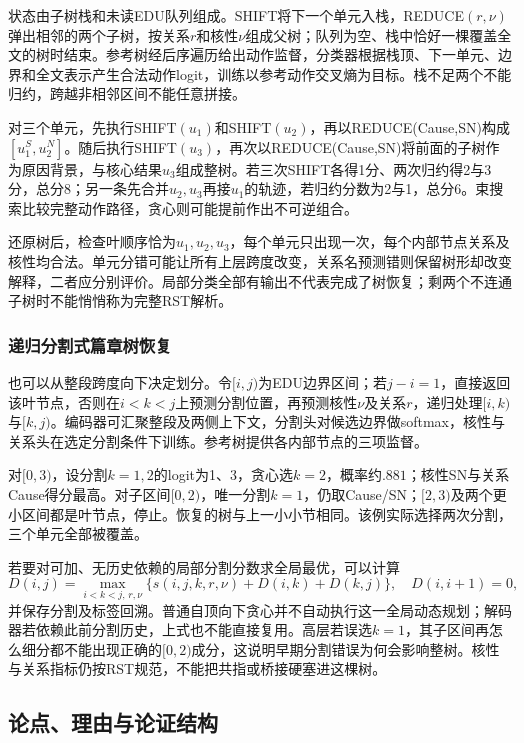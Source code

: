 状态由子树栈和未读EDU队列组成。SHIFT将下一个单元入栈，REDUCE$(r,\nu)$弹出相邻的两个子树，按关系$r$和核性$\nu$组成父树；队列为空、栈中恰好一棵覆盖全文的树时结束。参考树经后序遍历给出动作监督，分类器根据栈顶、下一单元、边界和全文表示产生合法动作logit，训练以参考动作交叉熵为目标。栈不足两个不能归约，跨越非相邻区间不能任意拼接。

对三个单元，先执行SHIFT$(u_1)$和SHIFT$(u_2)$，再以REDUCE(Cause,SN)构成$[u_1^{S},u_2^{N}]$。随后执行SHIFT$(u_3)$，再次以REDUCE(Cause,SN)将前面的子树作为原因背景，与核心结果$u_3$组成整树。若三次SHIFT各得1分、两次归约得2与3分，总分8；另一条先合并$u_2,u_3$再接$u_1$的轨迹，若归约分数为2与1，总分6。束搜索比较完整动作路径，贪心则可能提前作出不可逆组合。

还原树后，检查叶顺序恰为$u_1,u_2,u_3$，每个单元只出现一次，每个内部节点关系及核性均合法。单元分错可能让所有上层跨度改变，关系名预测错则保留树形却改变解释，二者应分别评价。局部分类全部有输出不代表完成了树恢复；剩两个不连通子树时不能悄悄称为完整RST解析。

\subsubsection{递归分割式篇章树恢复}
\label{sec:nlp-analysis-rst-split}

也可以从整段跨度向下决定划分。令$[i,j)$为EDU边界区间；若$j-i=1$，直接返回该叶节点，否则在$i<k<j$上预测分割位置，再预测核性$\nu$及关系$r$，递归处理$[i,k)$与$[k,j)$。编码器可汇聚整段及两侧上下文，分割头对候选边界做softmax，核性与关系头在选定分割条件下训练。参考树提供各内部节点的三项监督。

对$[0,3)$，设分割$k=1,2$的logit为1、3，贪心选$k=2$，概率约$.881$；核性SN与关系Cause得分最高。对子区间$[0,2)$，唯一分割$k=1$，仍取Cause/SN；$[2,3)$及两个更小区间都是叶节点，停止。恢复的树与上一小小节相同。该例实际选择两次分割，三个单元全部被覆盖。

若要对可加、无历史依赖的局部分割分数求全局最优，可以计算
\[
 D(i,j)=\max_{i<k<j,\,r,\nu}
       \{s(i,j,k,r,\nu)+D(i,k)+D(k,j)\},
 \quad D(i,i+1)=0,
\]
并保存分割及标签回溯。普通自顶向下贪心并不自动执行这一全局动态规划；解码器若依赖此前分割历史，上式也不能直接复用。高层若误选$k=1$，其子区间再怎么细分都不能出现正确的$[0,2)$成分，这说明早期分割错误为何会影响整树。核性与关系指标仍按RST规范，不能把共指或桥接硬塞进这棵树。

\subsection{论点、理由与论证结构}
\label{sec:nlp-analysis-argumentation}

